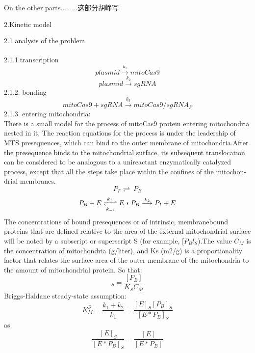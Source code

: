 \documentclass[UTF8]{ctexart}%
\begin{document}
	On the other parts.........这部分胡峥写
	\begin{center}
	{\Large 2.Kinetic model} 
    \end{center}
  {\Large 2.1 analysis of the problem} 
\\\\
2.1.1.transcription
	\begin{displaymath}
	plasmid \stackrel{k_1}{\longrightarrow} mitoCas9 
	\end{displaymath}
	\begin{displaymath}
	plasmid\stackrel{k_2}{\longrightarrow}sgRNA
	\end{displaymath}
	2.1.2. bonding
	\begin{displaymath}
	mitoCas9+sgRNA\stackrel{k_3}{\longrightarrow}mitoCas9/sgRNA_F
	\end{displaymath}
	2.1.3. entering mitochondria:\\
There is a small model for the process of mitoCas9 protein entering mitochondria nested in it.
The reaction equations for the process is under the leadership of MTS presequences, which can bind to the outer membrane of mitochondria.After the presequence binds to the mitochondrial sutface, its
subsequent translocation can be considered to be analogous to a unireactant enzymatically catalyzed process, except that all the steps take place within the confines of the mitochon­ drial membranes. 
\begin{displaymath}
P_F\rightleftharpoons\ P_B
\end{displaymath}
\begin{displaymath}
P_B+E \xrightleftharpoons[k_{-1}]{k_1}  E * P_B \stackrel{k_2}{\longrightarrow} P_I+E
\end{displaymath}
The concentrations of bound presequences or of intrinsic, membranebound proteins that are defined relative to the area of the external mitochondrial surface will be noted by a subscript or superscript S (for example, $[P_Bl_S$).The value $C_M$ is the concentration of mitochondria (g/liter), and Ks (m2/g) is a proportionality factor that relates the surface area of the outer membrane of the mitochondria to the amount of mitochondrial protein. So that:
\begin{equation}
[P_B]_S=\frac{[P_B]}{K_S C_M}
\end{equation}
Briggs-Haldane steady-state assumption:
\begin{equation}
K_M^S=\frac{k_1+k_2}{k_1}=\frac{[E]_S [P_B]_S}{[E*P_B]_S}
\end{equation}
as
\begin{equation}
\frac{[E]_S}{[E*P_B]_S}=\frac{[E]}{[E*P_B]}
\end{equation}
\end{document}
